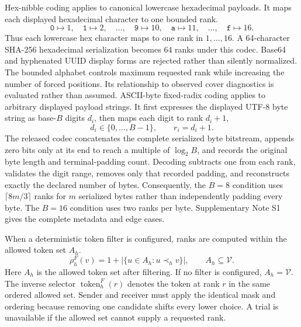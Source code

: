 \documentclass[fleqn,10pt]{wlscirep}
\begin{document}
Hex-nibble coding applies to canonical lowercase hexadecimal payloads. It maps each displayed hexadecimal character to one bounded rank.
\begin{equation}
\texttt{0}\mapsto 1,\quad
\texttt{1}\mapsto 2,\quad
\ldots,\quad
\texttt{9}\mapsto 10,\quad
\texttt{a}\mapsto 11,\quad
\ldots,\quad
\texttt{f}\mapsto 16.
\label{eq:hex-nibble-map}
\end{equation}
Thus each lowercase hex character maps to one rank in \(1,\ldots,16\). A 64-character SHA-256 hexadecimal serialization becomes 64 ranks under this codec. Base64 and hyphenated UUID display forms are rejected rather than silently normalized. The bounded alphabet controls maximum requested rank while increasing the number of forced positions. Its relationship to observed cover diagnostics is evaluated rather than assumed.
ASCII-byte fixed-radix coding applies to arbitrary displayed payload strings. It first expresses the displayed UTF-8 byte string as base-\(B\) digits \(d_i\), then maps each digit to rank \(d_i+1\),
\begin{equation}
d_i\in\{0,\ldots,B-1\},
\qquad
r_i=d_i+1.
\label{eq:ascii-radix-map}
\end{equation}
The released codec concatenates the complete serialized byte bitstream, appends zero bits only at its end to reach a multiple of \(\log_2B\), and records the original byte length and terminal-padding count. Decoding subtracts one from each rank, validates the digit range, removes only that recorded padding, and reconstructs exactly the declared number of bytes. Consequently, the \(B=8\) condition uses \(\lceil8m/3\rceil\) ranks for \(m\) serialized bytes rather than independently padding every byte. The \(B=16\) condition uses two ranks per byte. Supplementary Note S1 gives the complete metadata and edge cases.

When a deterministic token filter is configured, ranks are computed within the allowed token set \(A_h\).
\begin{equation}
\rho^F_h(v)=1+\left|\{u\in A_h:u\prec_h v\}\right|,
\qquad
A_h\subseteq\mathcal V.
\label{eq:filtered-rank}
\end{equation}
Here \(A_h\) is the allowed token set after filtering. If no filter is configured, \(A_h=\mathcal V\). The inverse selector \(\operatorname{token}_h^F(r)\) denotes the token at rank \(r\) in the same ordered allowed set. Sender and receiver must apply the identical mask and ordering because removing one candidate shifts every lower choice. A trial is unavailable if the allowed set cannot supply a requested rank.
\end{document}
